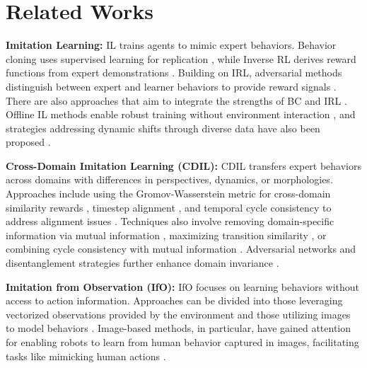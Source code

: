 \section{Related Works}
\label{sec:related}

\vspace{-0.1in}
\textbf{Imitation Learning:} IL trains agents to mimic expert behaviors. Behavior cloning uses supervised learning for replication \cite{kelly2019hg, sasaki2020behavioral, reddysqil, florence2022implicit, shafiullah2022behavior, hoque2023fleet, li2024imitation, mehta2025stable}, while Inverse RL derives reward functions from expert demonstrations \cite{Abbeel2004, Ziebart2008, dadashi2020primal, wang2022adversarially}. Building on IRL, adversarial methods distinguish between expert and learner behaviors to provide reward signals \cite{Ho2016, fu2017learning,li2017infogail, peng2018variational,lee2019efficient, ghasemipour2020divergence}. There are also approaches that aim to integrate the strengths of BC and IRL \cite{watson2024coherent}. Offline IL methods enable robust training without environment interaction \cite{kim2022demodice, xu2022discriminator,ma2022versatile, xu2022a,hong2023beyond,yan2023offline,  li2023mahalo, zhang2023discriminator, sun2023offline}, and strategies addressing dynamic shifts through diverse data have also been proposed \cite{Chae2022}.

\textbf{Cross-Domain Imitation Learning (CDIL):} CDIL transfers expert behaviors across domains with differences in perspectives, dynamics, or morphologies. Approaches include using the Gromov-Wasserstein metric for cross-domain similarity rewards \cite{fickinger2022gromov}, timestep alignment \cite{sermanet2018, Kim2020, Liu2018, Raychaudhuri2021}, and temporal cycle consistency to address alignment issues \cite{Zakka2022}. Techniques also involve removing domain-specific information via mutual information \cite{Cetin2021}, maximizing transition similarity \cite{Franzmeyer2022}, or combining cycle consistency with mutual information \cite{yin2022cross}. Adversarial networks and disentanglement strategies further enhance domain invariance \cite{Stadie2017, Sharma2019, shang2021, choi2024domain}.


\textbf{Imitation from Observation (IfO):} IfO focuses on learning behaviors without access to action information. Approaches can be divided into those leveraging vectorized observations provided by the environment \cite{Torabi2018generative, zhu2020off,desgarat2020, gangwani2022imitation, chang2022flow, liu2023ceil, freund2023coupled} and those utilizing images to model behaviors \cite{li2018oil, liang2018cirl,das2021model, karnan2022voila, karnan2022adversarial, belkhale2023hydra, zhang2024action,xie2024decomposing, ishida2024robust, aoki2024environmental}. Image-based methods, in particular, have gained attention for enabling robots to learn from human behavior captured in images, facilitating tasks like mimicking human actions \cite{sheng2014integrated, yu2018, zhang2022one, mandlekar2023human}.

